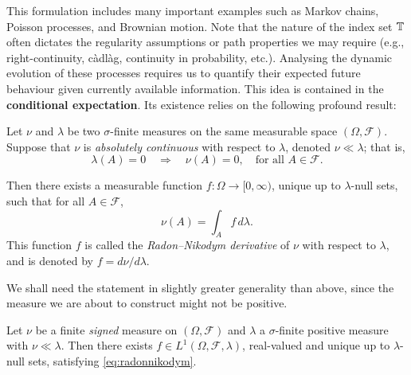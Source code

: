 This formulation includes many important examples such as Markov chains, Poisson processes, and Brownian motion. Note that the nature of the index set \(\mathbb{T}\) often dictates the regularity assumptions or path properties we may require (e.g., right-continuity, càdlàg, continuity in probability, etc.).  Analysing the dynamic evolution of these processes requires us to quantify their expected future behaviour given currently available information. This idea is contained in the \textbf{conditional expectation}. Its existence relies on the following profound result:

\begin{theorem}\label{thm:radon-nikodym}
    Let \(\nu\) and \(\lambda\) be two \(\sigma\)-finite measures on the same measurable space \((\Omega, \mathcal{F})\). Suppose that \(\nu\) is \emph{absolutely continuous} with respect to \(\lambda\), denoted \(\nu \ll \lambda\); that is,
\begin{equation} \label{eq:abscont}
\lambda(A) = 0 \quad \Rightarrow \quad \nu(A) = 0, \quad \text{for all } A \in \mathcal{F}.
\end{equation}

\noindent Then there exists a measurable function \(f : \Omega \to [0, \infty)\), unique up to $\lambda$-null sets, such that for all \(A \in \mathcal{F}\),
\begin{equation} \label{eq:radonnikodym}
\nu(A) = \int_A f \, d\lambda.
\end{equation}
This function \(f\) is called the \emph{Radon--Nikodym derivative} of \(\nu\) with respect to \(\lambda\), and is denoted by $f = d\nu/d\lambda$. \qedopentext
\end{theorem}


We shall need the statement in slightly greater generality than above, since the measure we are about to construct might not be positive.

\begin{corollary}\label{cor:radon-nikodym-signed}
Let $\nu$ be a finite \emph{signed} measure on $(\Omega,\mathcal{F})$ and $\lambda$ a $\sigma$-finite positive measure with $\nu \ll \lambda$. Then there exists $f \in L^1(\Omega,\mathcal{F},\lambda)$, real-valued and unique up to $\lambda$-null sets, satisfying \eqref{eq:radonnikodym}.
\end{corollary}

